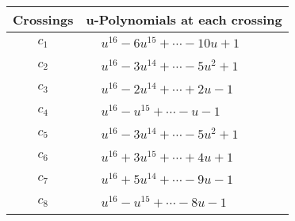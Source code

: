 \documentclass[1p]{elsarticle_modified}
\theoremstyle{definition}
\begin{document}
\begin{tabular}{m{50pt}|m{274pt}}
Crossings & \hspace{64pt}u-Polynomials at each crossing \\
\hline $$\begin{aligned}c_{1}\end{aligned}$$&$\begin{aligned}
&u^{16}-6 u^{15}+\cdots-10 u+1
\end{aligned}$\\
\hline $$\begin{aligned}c_{2}\end{aligned}$$&$\begin{aligned}
&u^{16}-3 u^{14}+\cdots-5 u^2+1
\end{aligned}$\\
\hline $$\begin{aligned}c_{3}\end{aligned}$$&$\begin{aligned}
&u^{16}-2 u^{14}+\cdots+2 u-1
\end{aligned}$\\
\hline $$\begin{aligned}c_{4}\end{aligned}$$&$\begin{aligned}
&u^{16}- u^{15}+\cdots- u-1
\end{aligned}$\\
\hline $$\begin{aligned}c_{5}\end{aligned}$$&$\begin{aligned}
&u^{16}-3 u^{14}+\cdots-5 u^2+1
\end{aligned}$\\
\hline $$\begin{aligned}c_{6}\end{aligned}$$&$\begin{aligned}
&u^{16}+3 u^{15}+\cdots+4 u+1
\end{aligned}$\\
\hline $$\begin{aligned}c_{7}\end{aligned}$$&$\begin{aligned}
&u^{16}+5 u^{14}+\cdots-9 u-1
\end{aligned}$\\
\hline $$\begin{aligned}c_{8}\end{aligned}$$&$\begin{aligned}
&u^{16}- u^{15}+\cdots-8 u-1
\end{aligned}$\\

\end{tabular}
\end{document}
